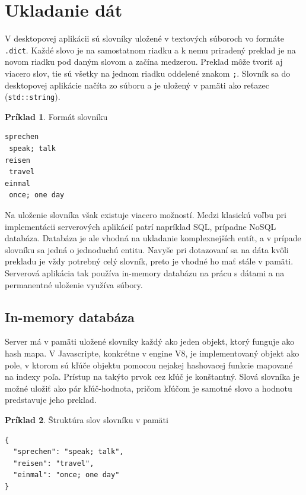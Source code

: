 \documentclass[
  digital, %
  table,   %
  lof,     %
  lot,     %
]{fithesis3}
\begin{document}
\section{Ukladanie dát}
V desktopovej aplikácii sú slovníky uložené v textových súboroch vo formáte \texttt{.dict}. Každé slovo je na samostatnom riadku a k nemu priradený preklad je na novom riadku pod daným slovom a začína medzerou. Preklad môže tvoriť aj viacero slov, tie sú všetky na jednom riadku oddelené znakom \texttt{;}. Slovník sa do desktopovej aplikácie načíta zo súboru a je uložený v pamäti ako reťazec (\texttt{std::string}).

\theoremstyle{definition}
\newtheorem{exmp}{Príklad}[chapter]
\begin{exmp}
Formát slovníku
\centering
\begin{lstlisting}[basicstyle=\small]
sprechen
 speak; talk
reisen
 travel
einmal
 once; one day
\end{lstlisting}
\end{exmp}

Na uloženie slovníka však existuje viacero možností. Medzi klasickú voľbu pri implementácii serverových aplikácií patrí napríklad SQL, prípadne NoSQL databáza. Databáza je ale vhodná na ukladanie komplexnejších entít, a v prípade slovníku sa jedná o jednoduchú entitu. Navyše pri dotazovaní sa na dáta kvôli prekladu je vždy potrebný celý slovník, preto je vhodné ho mať stále v pamäti. Serverová aplikácia tak používa in-memory databázu na prácu s dátami a na permanentné uloženie využíva súbory.

\subsection{In-memory databáza}
Server má v pamäti uložené slovníky každý ako jeden objekt, ktorý funguje ako hash mapa. V Javascripte, konkrétne v engine V8, je implementovaný objekt ako pole, v ktorom sú kľúče objektu pomocou nejakej hashovacej funkcie mapované na indexy poľa. Prístup na takýto prvok cez kľúč je konštantný. Slová slovníka je možné uložiť ako pár kľúč-hodnota, pričom kľúčom je samotné slovo a hodnotu predstavuje jeho preklad.

\begin{exmp}
Štruktúra slov slovníku v pamäti
\centering
\begin{lstlisting}[basicstyle=\small]
{
  "sprechen": "speak; talk",
  "reisen": "travel",
  "einmal": "once; one day"
}
\end{lstlisting}
\end{exmp}
\end{document}
